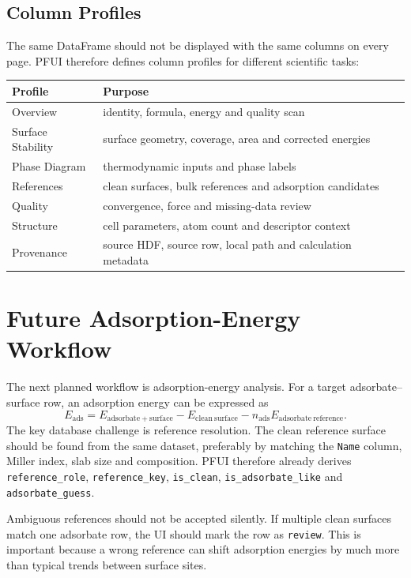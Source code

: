 \documentclass[12pt,a4paper,oneside]{report}
\begin{document}
\section{Column Profiles}

The same DataFrame should not be displayed with the same columns on every page.
PFUI therefore defines column profiles for different scientific tasks:
\begin{longtable}{p{}p{}}
  \toprule
  Profile & Purpose \\
  \midrule
  Overview & identity, formula, energy and quality scan \\
  Surface Stability & surface geometry, coverage, area and corrected energies \\
  Phase Diagram & thermodynamic inputs and phase labels \\
  References & clean surfaces, bulk references and adsorption candidates \\
  Quality & convergence, force and missing-data review \\
  Structure & cell parameters, atom count and descriptor context \\
  Provenance & source HDF, source row, local path and calculation metadata \\
  \bottomrule
\end{longtable}

\chapter{Future Adsorption-Energy Workflow}

The next planned workflow is adsorption-energy analysis. For a target
adsorbate--surface row, an adsorption energy can be expressed as
\begin{equation}
  E_\mathrm{ads}
  =
  E_{\mathrm{adsorbate+surface}}
  -
  E_{\mathrm{clean~surface}}
  -
  n_{\mathrm{ads}}E_{\mathrm{adsorbate~reference}}.
  \label{eq:eads}
\end{equation}
The key database challenge is reference resolution. The clean reference surface
should be found from the same dataset, preferably by matching the \texttt{Name}
column, Miller index, slab size and composition. PFUI therefore already derives
\texttt{reference\_role}, \texttt{reference\_key},
\texttt{is\_clean}, \texttt{is\_adsorbate\_like} and
\texttt{adsorbate\_guess}.

Ambiguous references should not be accepted silently. If multiple clean
surfaces match one adsorbate row, the UI should mark the row as
\texttt{review}. This is important because a wrong reference can shift
adsorption energies by much more than typical trends between surface sites.
\end{document}
